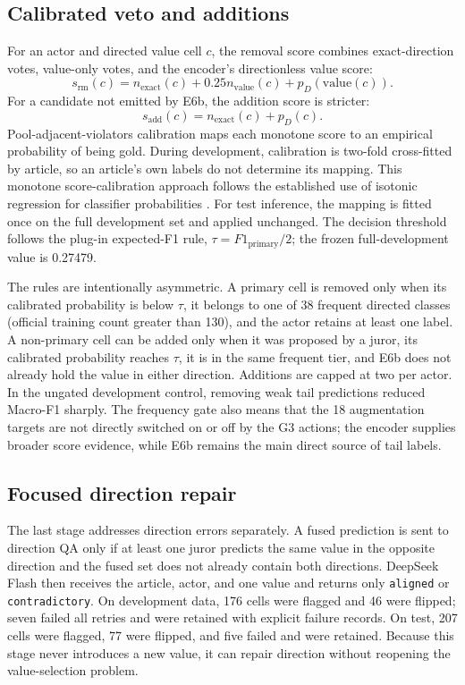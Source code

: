 \documentclass[sigconf,article,a4paper]{acmart}
\begin{document}
\subsection{Calibrated veto and additions}

For an actor and directed value cell $c$, the removal score combines
exact-direction votes, value-only votes, and the encoder's directionless value
score:
\begin{equation}
s_{\mathrm{rm}}(c)=n_{\mathrm{exact}}(c)+0.25n_{\mathrm{value}}(c)
 +p_D(\mathrm{value}(c)).
\end{equation}
For a candidate not emitted by E6b, the addition score is stricter:
\begin{equation}
s_{\mathrm{add}}(c)=n_{\mathrm{exact}}(c)+p_D(c).
\end{equation}
Pool-adjacent-violators calibration maps each monotone score to an empirical
probability of being gold. During development, calibration is two-fold
cross-fitted by article, so an article's own labels do not determine its
mapping. This monotone score-calibration approach follows the established use
of isotonic regression for classifier probabilities \cite{zadrozny2002}. For
test inference, the mapping is fitted once on the full development
set and applied unchanged. The decision threshold follows the plug-in
expected-F1 rule, $\tau=F1_{\mathrm{primary}}/2$; the frozen full-development
value is 0.27479.

The rules are intentionally asymmetric. A primary cell is removed only when
its calibrated probability is below $\tau$, it belongs to one of 38 frequent
directed classes (official training count greater than 130), and the actor
retains at least one label. A non-primary cell can be added only when it was
proposed by a juror, its calibrated probability reaches $\tau$, it is in the
same frequent tier, and E6b does not already hold the value in either direction.
Additions are capped at two per actor. In the ungated development control,
removing weak tail predictions reduced Macro-F1 sharply. The frequency gate
also means that the 18 augmentation targets are not directly
switched on or off by the G3 actions; the encoder supplies broader score
evidence, while E6b remains the main direct source of tail labels.

\subsection{Focused direction repair}

The last stage addresses direction errors separately. A fused prediction is sent to
direction QA only if at least one juror predicts the same value in the opposite
direction and the fused set does not already contain both directions. DeepSeek
Flash then receives the article, actor, and one value and returns only
\texttt{aligned} or \texttt{contradictory}. On development data, 176 cells were
flagged and 46 were flipped; seven failed all retries and were retained with
explicit failure records. On test, 207 cells were flagged, 77 were flipped,
and five failed and were retained. Because this stage never introduces a new
value, it can repair direction without reopening the value-selection problem.
\end{document}
